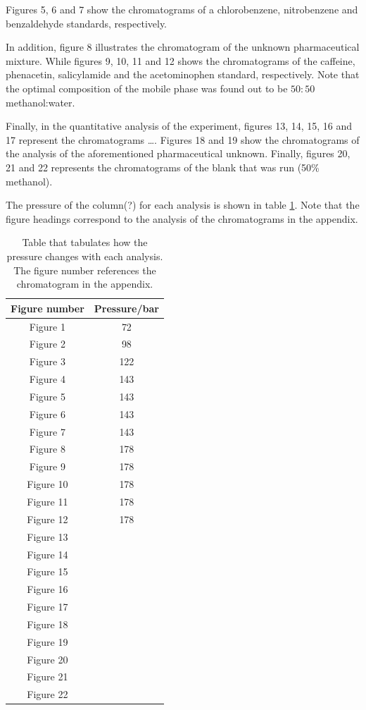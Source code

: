 \documentclass[a4paper, 12pt]{article}
\begin{document}
Figures 5, 6 and 7 show the chromatograms of a chlorobenzene, nitrobenzene and benzaldehyde standards, respectively.

In addition, figure 8 illustrates the chromatogram of the unknown pharmaceutical mixture. While figures 9, 10, 11 and 12 shows the chromatograms of the caffeine, phenacetin, salicylamide and the acetominophen standard, respectively. Note that the optimal composition of the mobile phase was found out to be $50:50$ methanol:water.

Finally, in the quantitative analysis of the experiment, figures 13, 14, 15, 16 and 17 represent the chromatograms \dots{}. Figures 18 and 19 show the chromatograms of the analysis of the aforementioned pharmaceutical unknown. Finally, figures 20, 21 and 22 represents the chromatograms of the blank that was run (50\% methanol).

The pressure of the column(?) for each analysis is shown in table \ref{tab-pressure}. Note that the figure headings correspond to the analysis of the chromatograms in the appendix.

\begin{table}[h!]
	\centering
	\caption{Table that tabulates how the pressure changes with each analysis. The figure number references the chromatogram in the appendix.}
	\begin{tabular}{|c|c|}
		\hline
		Figure number & Pressure/bar\\
		\hline
		Figure 1  & 72 \\ 
		\hline
		Figure 2 & 98 \\
		\hline
		Figure 3 & 122 \\
		\hline
		Figure 4 & 143 \\
		\hline
		Figure 5 & 143 \\
		\hline
		Figure 6 & 143 \\
		\hline
		Figure 7 & 143 \\
		\hline
		Figure 8 & 178 \\
		\hline
		Figure 9 & 178 \\
		\hline
		Figure 10 & 178 \\
		\hline
		Figure 11 & 178 \\
		\hline
		Figure 12 & 178 \\
		\hline
		Figure 13 & \\
		\hline
		Figure 14 & \\
		\hline
		Figure 15 & \\
		\hline
		Figure 16 & \\
		\hline
		Figure 17 & \\
		\hline
		Figure 18 & \\
		\hline
		Figure 19 & \\
		\hline
		Figure 20 & \\
		\hline
		Figure 21 & \\
		\hline
		Figure 22 &  \\ 
		\hline
	\end{tabular}
	\label{tab-pressure}
\end{table}
\end{document}
